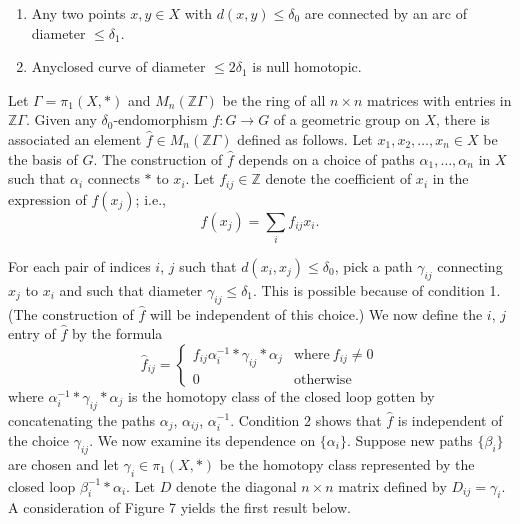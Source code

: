 \begin{enumerate}
\item Any two points $x, y \in X$ with $d(x, y) \leq \delta_0$ are
  connected by an arc of diameter $\leq \delta_1$.
  \item Any\pageoriginale closed curve of diameter $\leq 2 \delta_1$ is null homotopic.
\end{enumerate}

Let $\Gamma = \pi_1 (X, *)$ and $M_n (\mathbb{Z} \Gamma)$ be the ring
of all $n \times n$ matrices with entries in $\mathbb{Z}\Gamma$. Given
any $\delta_0$-endomorphism $f: G \to G$ of a geometric group on $X$,
there is associated an element $\hat{f} \in M_n (\mathbb{Z}\Gamma)$
defined as follows. Let $x_1, x_2, \ldots , x_n \in X$ be the basis of
$G$. The construction of $\hat{f}$ depends on a choice of paths
$\alpha_1, \ldots , \alpha_n$ in $X$ such that $\alpha_i$ connects $*$
to $x_i$. Let $f_{ij} \in \mathbb{Z}$ denote the coefficient of $x_i$
in the expression of $f(x_j)$; i.e.,
$$
f(x_j) = \sum_i f_{ij} x_i.
$$

For each pair of indices $i$, $j$ such that $d(x_i, x_j) \leq
\delta_0$, pick a path $\gamma_{ij}$ connecting $x_j$ to $x_i$ and
such that diameter $\gamma_{ij} \leq \delta_1$. This is possible
because of condition 1. (The construction of $\hat{f}$ will be
independent of this choice.) We now define the $i$, $j$ entry of
$\hat{f}$ by the formula
$$
\hat{f}_{ij}=
\begin{cases}
  f_{ij} \alpha_i^{-1} * \gamma_{ij} * \alpha_j & \text{where}~ f_{ij}
  \neq 0\\
  0 & \text{otherwise}
\end{cases}
$$
where $\alpha_i^{-1} * \gamma_{ij} * \alpha_j$ is the homotopy class
of the closed loop gotten by concatenating the paths $\alpha_j$,
$\alpha_{ij}$, $\alpha_i^{-1}$. Condition 2 shows that $\hat{f}$ is
independent of the choice $\gamma_{ij}$. We now examine its dependence
on $\{ \alpha_i\}$. Suppose new paths $\{\beta_i \}$ are chosen and
let $\gamma_i \in \pi_1 (X, *)$ be the homotopy class represented by
the closed loop $\beta_i^{-1}* \alpha_i$. Let $D$ denote the diagonal
$n \times n$ matrix defined by $D_{ij}= \gamma_i$. A consideration of
Figure 7 yields the first result below.

